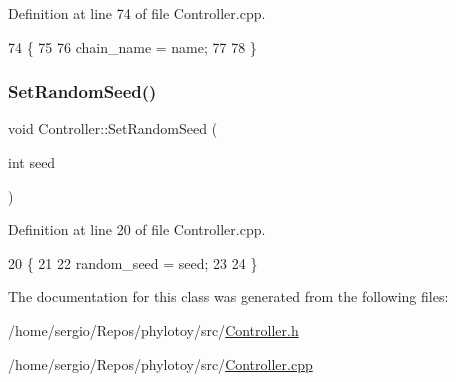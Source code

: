 Definition at line 74 of file Controller.\+cpp.


\begin{DoxyCode}
74                                             \{
75   
76   chain\_name = name;
77   
78 \}
\end{DoxyCode}
\mbox{\label{classController_a1438b54d76df7239f361bd93dfbf9246}} 
\subsubsection{\texorpdfstring{Set\+Random\+Seed()}{SetRandomSeed()}}
{\footnotesize\ttfamily void Controller\+::\+Set\+Random\+Seed (\begin{DoxyParamCaption}\item[{int}]{seed }\end{DoxyParamCaption})}



Definition at line 20 of file Controller.\+cpp.


\begin{DoxyCode}
20                                        \{
21   
22   random\_seed = seed;
23   
24 \}
\end{DoxyCode}


The documentation for this class was generated from the following files\+:\begin{DoxyCompactItemize}
\item 
/home/sergio/\+Repos/phylotoy/src/\hyperlink{Controller_8h}{Controller.\+h}\item 
/home/sergio/\+Repos/phylotoy/src/\hyperlink{Controller_8cpp}{Controller.\+cpp}\end{DoxyCompactItemize}
